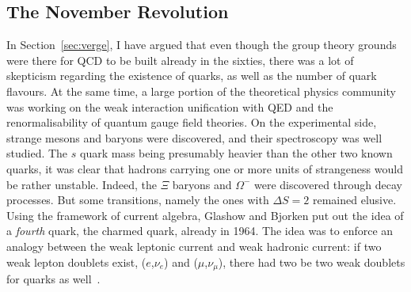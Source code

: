 \subsection{The November Revolution}
\label{sec:november}

In Section~\ref{sec:verge}, I have argued that even though the group
theory grounds were there for QCD to be built already in the sixties, there was a lot
of skepticism regarding the existence of quarks, as well as the
number of quark flavours. At the same time, a large portion of the
theoretical physics community was working on the weak interaction
unification with QED and the renormalisability of quantum gauge field
theories. On the experimental side, strange mesons and baryons were
discovered, and their spectroscopy was well studied. The $s$ quark
mass being presumably heavier than the other two known quarks, it was
clear that hadrons carrying one or more units of strangeness would be
rather unstable. Indeed, the $\Xi$ baryons and $\Omega^{-}$ were
discovered through decay processes. But some transitions, namely the
ones with $\Delta S = 2$ remained elusive. Using the framework of
current algebra, Glashow and Bjorken put out the idea of a
\textit{fourth} quark, the charmed quark, already in 1964. The idea
was to enforce an analogy between the weak leptonic current and weak
hadronic current: if two weak lepton doublets exist, ($e$,$\nu_{e}$)
and ($\mu$,$\nu_{\mu}$), there had two be two weak doublets for quarks
as well~\cite{lai}. 


